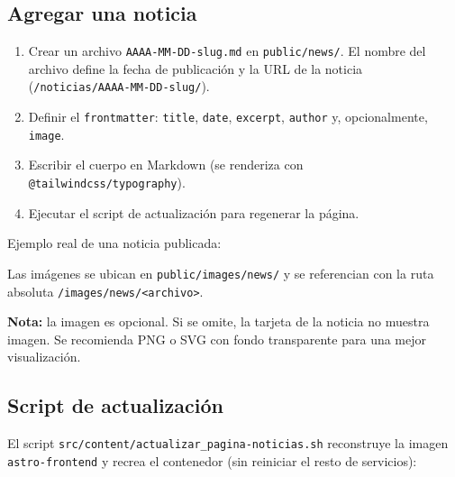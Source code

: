 \documentclass[12pt,a4paper]{report}
\begin{document}
\subsection{Agregar una noticia}

\begin{enumerate}
  \item Crear un archivo \texttt{AAAA-MM-DD-slug.md} en \texttt{public/news/}.
        El nombre del archivo define la fecha de publicación y la URL de la
        noticia (\texttt{/noticias/AAAA-MM-DD-slug/}).
  \item Definir el \texttt{frontmatter}: \texttt{title}, \texttt{date},
        \texttt{excerpt}, \texttt{author} y, opcionalmente, \texttt{image}.
  \item Escribir el cuerpo en Markdown (se renderiza con
        \texttt{@tailwindcss/typography}).
  \item Ejecutar el script de actualización para regenerar la página.
\end{enumerate}

Ejemplo real de una noticia publicada:


Las imágenes se ubican en \texttt{public/images/news/} y se referencian con la
ruta absoluta \texttt{/images/news/<archivo>}.

\begin{mdframed}[style=importantstyle]
  \textbf{Nota:} la imagen es opcional. Si se omite, la tarjeta de la noticia
  no muestra imagen. Se recomienda PNG o SVG con fondo transparente para una
  mejor visualización.
\end{mdframed}

\subsection{Script de actualización}

El script \texttt{src/content/actualizar\_pagina-noticias.sh} reconstruye la
imagen \texttt{astro-frontend} y recrea el contenedor (sin reiniciar el resto
de servicios):
\end{document}

